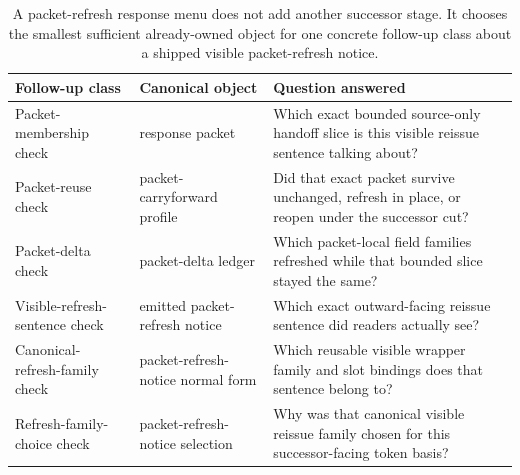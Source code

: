\documentclass[11pt]{article}
\begin{document}
\begin{table}[t]
\centering
\small
\begin{tabularx}{\linewidth}{@{}l l X@{}}
\toprule
Follow-up class & Canonical object & Question answered \\
\midrule
Packet-membership check & response packet & Which exact bounded source-only handoff slice is this visible reissue sentence talking about? \\
Packet-reuse check & packet-carryforward profile & Did that exact packet survive unchanged, refresh in place, or reopen under the successor cut? \\
Packet-delta check & packet-delta ledger & Which packet-local field families refreshed while that bounded slice stayed the same? \\
Visible-refresh-sentence check & emitted packet-refresh notice & Which exact outward-facing reissue sentence did readers actually see? \\
Canonical-refresh-family check & packet-refresh-notice normal form & Which reusable visible wrapper family and slot bindings does that sentence belong to? \\
Refresh-family-choice check & packet-refresh-notice selection & Why was that canonical visible reissue family chosen for this successor-facing token basis? \\
\bottomrule
\end{tabularx}
\caption{A packet-refresh response menu does not add another successor stage. It chooses the smallest sufficient already-owned object for one concrete follow-up class about a shipped visible packet-refresh notice.}
\label{tab:publicrequestresponsepacketrefreshresponsemenu}
\end{table}
\end{document}
